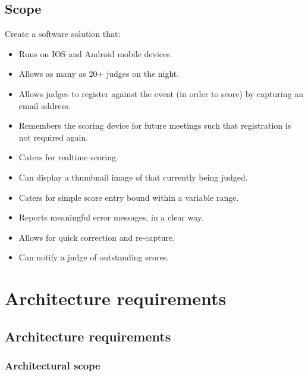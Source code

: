 \documentclass[10pt,a4paper]{article}
\begin{document}
\subsection{Scope}
Create a software solution that:
\begin{itemize}
\item Runs on IOS and Android mobile devices.
\item Allows as many as 20+ judges on the night.
\item Allows judges to register against the event (in order to score) by capturing an email address.
\item Remembers the scoring device for future meetings such that registration is not required again.
\item Caters for realtime scoring.
\item Can display a thumbnail image of that currently being judged.
\item Caters for simple score entry bound within a variable range.
\item Reports meaningful error messages, in a clear way.
\item Allows for quick correction and re-capture.
\item Can notify a judge of outstanding scores.
\end{itemize}

\section{Architecture requirements}
\subsection{Architecture requirements}
\subsubsection{Architectural scope}
\end{document}
